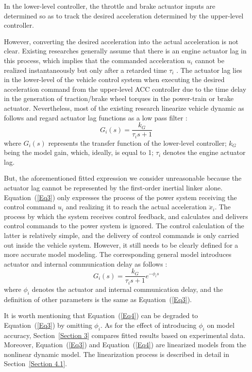\documentclass[journal]{IEEEtran}
\begin{document}
In the lower-level controller, the throttle and brake actuator inputs are determined so as to track the desired acceleration determined by the upper-level controller.

However, converting the desired acceleration into the actual acceleration is not clear. Existing researches generally assume that there is an engine actuator lag in this process, which implies that the commanded acceleration $u_i$ cannot be realized instantaneously but only after a retarded time $\tau_i$ \citep{Ploeg2011}. The actuator lag lies in the lower-level of the vehicle control system when executing the desired acceleration command from the upper-level ACC controller due to the time delay in the generation of traction/brake wheel torques in the power-train or brake actuator. Nevertheless, most of the existing research linearize vehicle dynamic as follows and regard actuator lag functions as a low pass filter \citep{Wang2018a,Naus2010}:
\begin{equation}
  G_i(s)=\frac{k_G}{\tau_is+1}
  \label{Eq3}
\end{equation}
where $G_i(s)$ represents the transfer function of the lower-level controller; $k_G$ being the model gain, which, ideally, is equal to 1; $\tau_i$ denotes the engine actuator lag.

But, the aforementioned fitted expression we consider unreasonable because the actuator lag cannot be represented by the first-order inertial linker alone. Equation~(\ref{Eq3}) only expresses the process of the power system receiving the control command $u_i$ and realizing it to reach the actual acceleration ${\ddot{x}}_i$. The process by which the system receives control feedback, and calculates and delivers control commands to the power system is ignored. The control calculation of the latter is relatively simple, and the delivery of control commands is only carried out inside the vehicle system. However, it still needs to be clearly defined for a more accurate model modeling. The corresponding general model introduces actuator and internal communication delay as follows \citep{Naus2010}:
\begin{equation}
  G_i(s)=\frac{k_G}{\tau_is+1}e^{-\phi_is}
  \label{Eq4}
\end{equation}
where $\phi_i$ denotes the actuator and internal communication delay, and the definition of other parameters is the same as Equation~(\ref{Eq3}).

It is worth mentioning that Equation~(\ref{Eq4}) can be degraded to Equation~(\ref{Eq3}) by omitting $\phi_i$. As for the effect of introducing $\phi_i$ on model accuracy, Section~\ref{Section 3} compares fitted results based on experimental data. Moreover, Equation~(\ref{Eq3}) and Equation~(\ref{Eq4}) are linearized models from the nonlinear dynamic model. The linearization process is described in detail in Section~\ref{Section 4.1}.
\end{document}
